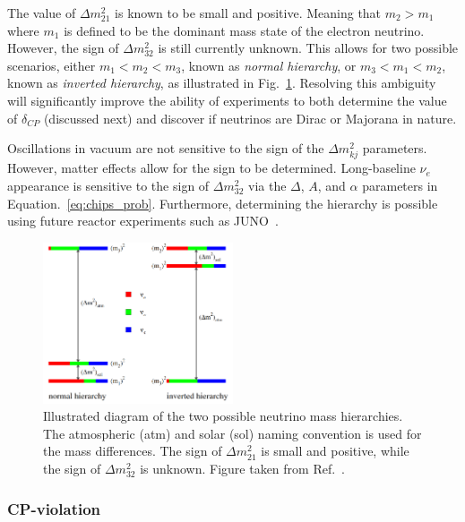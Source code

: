 The value of $\Delta m_{21}^2$ is known to be small and positive. Meaning that $m_{2}>m_{1}$ where
$m_{1}$ is defined to be the dominant mass state of the electron neutrino. However, the sign of
$\Delta m_{32}^2$ is still currently unknown. This allows for two possible scenarios, either
$m_1<m_2<m_3$, known as \emph{normal hierarchy}, or $m_3<m_1<m_2$, known as \emph{inverted
    hierarchy}, as illustrated in Fig.~\ref{fig:hierarchy}. Resolving this ambiguity will
significantly improve the ability of experiments to both determine the value of $\delta_{CP}$
(discussed next) and discover if neutrinos are Dirac or Majorana in nature.

Oscillations in vacuum are not sensitive to the sign of the $\Delta m_{kj}^{2}$ parameters.
However, matter effects allow for the sign to be determined. Long-baseline $\nu_{e}$ appearance is
sensitive to the sign of $\Delta m_{32}^2$ via the $\Delta$, $A$, and $\alpha$ parameters in
Equation.~\ref{eq:chips_prob}. Furthermore, determining the hierarchy is possible using future
reactor experiments such as JUNO~\cite{an2016}.

\begin{figure} %
    \includegraphics[origin=c,width=0.5\textwidth]{diagrams/3-theory/hierarchy.png}
    \caption[Illustration of the two possible neutrino mass hierarchies]
    {Illustrated diagram of the two possible neutrino mass hierarchies. The atmospheric (atm) and
        solar (sol) naming convention is used for the mass differences. The sign of $\Delta
            m_{21}^{2}$ is small and positive, while the sign of $\Delta m_{32}^{2}$ is unknown.
        Figure taken from Ref.~\cite{gouvea2013}.}
    \label{fig:hierarchy}
\end{figure}

\subsubsection*{CP-violation} %

